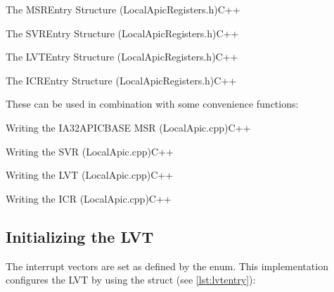\begin{codeblock}[label=lst:msrentry]{The MSREntry Structure (LocalApicRegisters.h)}{C++}
\end{codeblock}

\begin{codeblock}[label=lst:svrentry]{The SVREntry Structure (LocalApicRegisters.h)}{C++}
\end{codeblock}

\begin{codeblock}[label=lst:lvtentry]{The LVTEntry Structure (LocalApicRegisters.h)}{C++}
\end{codeblock}

\begin{codeblock}[label=lst:icrentry]{The ICREntry Structure (LocalApicRegisters.h)}{C++}
\end{codeblock}

These can be used in combination with some convenience functions:

\begin{codeblock}{Writing the IA32\textunderscore{}APIC\textunderscore{}BASE MSR (LocalApic.cpp)}{C++}
\end{codeblock}

\begin{codeblock}{Writing the SVR (LocalApic.cpp)}{C++}
\end{codeblock}

\begin{codeblock}{Writing the LVT (LocalApic.cpp)}{C++}
\end{codeblock}

\begin{codeblock}{Writing the ICR (LocalApic.cpp)}{C++}
\end{codeblock}

\subsection{Initializing the LVT}
\label{subsec:apxlvtinit}

The interrupt vectors are set as defined by the  enum.
This implementation configures the LVT by using the  struct (see \autoref{lst:lvtentry}):

